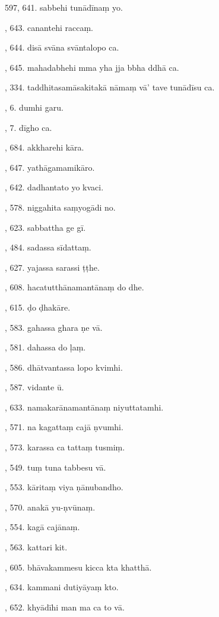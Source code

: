 597, 641. sabbehi tunādīnaṃ yo.\par {}, 643. canantehi raccaṃ.\par {}, 644. disā svāna svāntalopo ca.\par {}, 645. mahadabhehi mma yha jja bbha ddhā ca.\par {}, 334. taddhitasamāsakitakā nāmaṃ vā’ tave tunādīsu ca.\par {}, 6. dumhi garu.\par {}, 7. dīgho ca.\par {}, 684. akkharehi kāra.\par {}, 647. yathāgamamikāro.\par {}, 642. dadhantato yo kvaci.\par {}, 578. niggahita saṃyogādi no.\par {}, 623. sabbattha ge gī.\par {}, 484. sadassa sīdattaṃ.\par {}, 627. yajassa sarassi ṭṭhe.\par {}, 608. hacatutthānamantānaṃ do dhe.\par {}, 615. ḍo ḍhakāre.\par {}, 583. gahassa ghara ṇe vā.\par {}, 581. dahassa do ḷaṃ.\par {}, 586. dhātvantassa lopo kvimhi.\par {}, 587. vidante ū.\par {}, 633. namakarānamantānaṃ niyuttatamhi.\par {}, 571. na kagattaṃ cajā ṇvumhi.\par {}, 573. karassa ca tattaṃ tusmiṃ.\par {}, 549. tuṃ tuna tabbesu vā.\par {}, 553. kāritaṃ viya ṇānubandho.\par {}, 570. anakā yu-ṇvūnaṃ.\par {}, 554. kagā cajānaṃ.\par {}, 563. kattari kit.\par {}, 605. bhāvakammesu kicca kta khatthā.\par {}, 634. kammani dutiyāyaṃ kto.\par {}, 652. khyādīhi man ma ca to vā.\par \noindent
